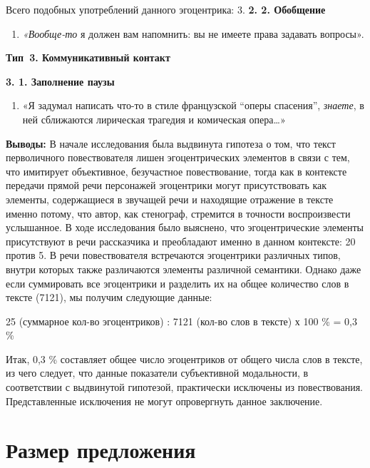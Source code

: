 \documentclass{kursa4}
\begin{document}
{      Всего подобных употреблений данного эгоцентрика: 3. \textbf{2. 2. Обобщение}
      \setcounter{saveenum}{\value{enumi}}
        \begin{enumerate}
        \setcounter{enumi}{\value{saveenum}}
        \item \textit{«Вообще-то} я должен вам напомнить: вы не имеете права задавать вопросы». \end{enumerate}
      {\centering
      \textbf{Тип~3. Коммуникативный контакт }
      \par}

      \textbf{3. 1. Заполнение паузы}

      \setcounter{saveenum}{\value{enumi}}
        \begin{enumerate}
        \setcounter{enumi}{\value{saveenum}}
        \item «Я задумал написать что-то в стиле французской “оперы спасения”, \textit{знаете}, в ней сближаются лирическая трагедия и комическая опера…» \end{enumerate}

      \textbf{Выводы:}{
      В начале исследования была выдвинута гипотеза о том, что текст перволичного повествователя лишен эгоцентрических элементов в связи с тем, что имитирует объективное, безучастное повествование, тогда как в контексте передачи прямой речи персонажей эгоцентрики могут присутствовать как элементы, содержащиеся в звучащей речи и находящие отражение в тексте именно потому, что автор, как стенограф, стремится в точности воспроизвести услышанное. В ходе исследования было выяснено, что эгоцентрические элементы присутствуют в речи рассказчика и преобладают именно в данном контексте: 20 против 5. В речи повествователя встречаются эгоцентрики различных типов, внутри которых также различаются элементы различной семантики. Однако даже если суммировать все эгоцентрики и разделить их на общее количество слов в тексте (7121), мы получим следующие данные:}

      {25 (суммарное кол-во эгоцентриков) : 7121 (кол-во слов в тексте) х 100 \% = 0,3 \%}

      Итак, 0,3 \% составляет общее число эгоцентриков от общего числа слов в тексте, из чего следует, что данные показатели субъективной модальности, в соответствии с выдвинутой гипотезой, практически исключены из повествования. Представленные исключения не могут опровергнуть данное заключение. \section{Размер предложения}

}
\end{document}

